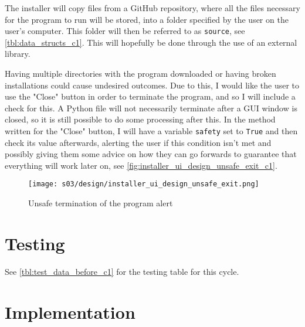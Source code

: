         The installer will copy files from a GitHub repository, where all the files necessary for the program to run will be stored, into a folder specified by the user on the user's computer. 
        This folder will then be referred to as \verb|source|, see \autoref{tbl:data_structs_c1}. 
        This will hopefully be done through the use of an external library.

        Having multiple directories with the program downloaded or having broken installations could cause undesired outcomes. 
        Due to this, I would like the user to use the "Close" button in order to terminate the program, and so I will include a check for this. 
        A Python file will not necessarily terminate after a GUI window is closed, so it is still possible to do some processing after this. 
        In the method written for the "Close" button, I will have a variable \verb|safety| set to \verb|True| and then check its value afterwards, alerting the user if this condition isn't met and possibly giving them some advice on how they can go forwards to guarantee that everything will work later on, see \autoref{fig:installer_ui_design_unsafe_exit_c1}.

        \begin{figure}[!ht]
            \centering
            \texttt{[image: s03/design/installer\_ui\_design\_unsafe\_exit.png]}
            \caption{Unsafe termination of the program alert}
            \label{fig:installer_ui_design_unsafe_exit_c1}
        \end{figure}


\section{Testing}

    See \autoref{tbl:test_data_before_c1} for the testing table for this cycle.


\section{Implementation}



